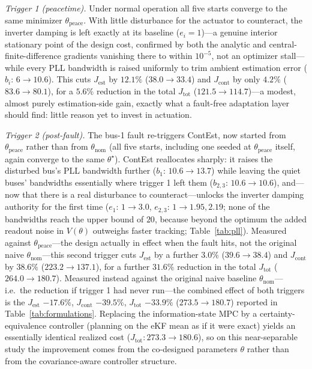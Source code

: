 \documentclass[twocolumn,amsthm]{autart}
\begin{document}
\emph{Trigger 1 (peacetime).} Under normal operation all five starts converge
to the same minimizer $\theta_{\mathrm{peace}}$. With little disturbance for
the actuator to counteract, the inverter damping is left exactly at its
baseline ($e_i=1$)---a genuine interior stationary point of the design cost,
confirmed by both the analytic and central-finite-difference gradients
vanishing there to within $10^{-5}$, not an optimizer stall---while every PLL
bandwidth is raised uniformly to trim ambient estimation error
($b_i\!:\,6\to10.6$). This cuts $J_{\mathrm{est}}$ by $12.1\%$
($38.0\to33.4$) and $J_{\mathrm{cont}}$ by only $4.2\%$ ($83.6\to80.1$), for a
$5.6\%$ reduction in the total $J_{\mathrm{tot}}$ ($121.5\to114.7$)---a modest,
almost purely estimation-side gain, exactly what a fault-free adaptation layer
should find: little reason yet to invest in actuation.

\emph{Trigger 2 (post-fault).} The bus-1 fault re-triggers ContEst, now
started from $\theta_{\mathrm{peace}}$ rather than from $\theta_{\mathrm{nom}}$
(all five starts, including one seeded at $\theta_{\mathrm{peace}}$ itself,
again converge to the same $\theta^\star$). ContEst reallocates sharply: it
raises the disturbed bus's PLL bandwidth further ($b_1\!:\,10.6\to13.7$) while
leaving the quiet buses' bandwidths essentially where trigger 1 left them
($b_{2,3}\!:\,10.6\to10.6$), and---now that there is a real disturbance to
counteract---unlocks the inverter damping authority for the first time
($e_1\!:\,1\to3.0$, $e_{2,3}\!:\,1\to1.95,2.19$; none of the bandwidths reach
the upper bound of $20$, because beyond the optimum the added readout noise in
$V(\theta)$ outweighs faster tracking; Table~\ref{tab:pll}). Measured against
$\theta_{\mathrm{peace}}$---the design actually in effect when the fault
hits, not the original naive $\theta_{\mathrm{nom}}$---this second trigger
cuts $J_{\mathrm{est}}$ by a further $3.0\%$ ($39.6\to38.4$) and
$J_{\mathrm{cont}}$ by $38.6\%$ ($223.2\to137.1$), for a further $31.6\%$
reduction in the total $J_{\mathrm{tot}}$ ($264.0\to180.7$). Measured instead
against the original naive baseline $\theta_{\mathrm{nom}}$---i.e.\ the
reduction if trigger 1 had never run---the combined effect of both triggers is
the $J_{\mathrm{est}}$ $-17.6\%$, $J_{\mathrm{cont}}$ $-39.5\%$,
$J_{\mathrm{tot}}$ $-33.9\%$ ($273.5\to180.7$) reported in
Table~\ref{tab:formulations}. Replacing the information-state MPC by
a certainty-equivalence controller (planning on the eKF mean as if it were exact)
yields an essentially identical realized cost ($J_{\mathrm{tot}}:273.3\to180.6$),
so on this near-separable study the improvement comes from the co-designed
parameters $\theta$ rather than from the covariance-aware controller structure.
\end{document}
